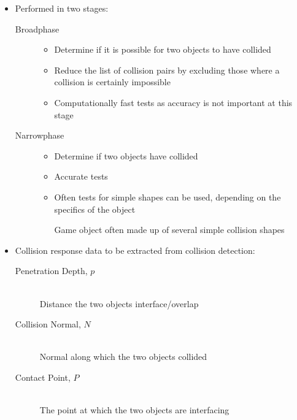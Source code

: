 \documentclass[a4paper]{article}
\begin{document}
\begin{itemize}
  \item
    Performed in two stages:
    \begin{description}
      \item[Broadphase] \hfill
        \begin{itemize}
          \item
            Determine if it is possible for two objects to have collided

          \item
            Reduce the list of collision pairs by excluding those where a
            collision is certainly impossible

          \item
            Computationally fast tests as accuracy is not important at this
            stage

        \end{itemize}

      \item[Narrowphase] \hfill
        \begin{itemize}
          \item
            Determine if two objects have collided

          \item
            Accurate tests

          \item
            Often tests for simple shapes can be used, depending on the
            specifics of the object

            Game object often made up of several simple collision shapes

        \end{itemize}

    \end{description}

  \item
    Collision response data to be extracted from collision detection:
    \begin{description}
      \item[Penetration Depth, $p$] \hfill \\
        Distance the two objects interface/overlap

      \item[Collision Normal, $N$] \hfill \\
        Normal along which the two objects collided

      \item[Contact Point, $P$] \hfill \\
        The point at which the two objects are interfacing

    \end{description}

\end{itemize}
\end{document}

